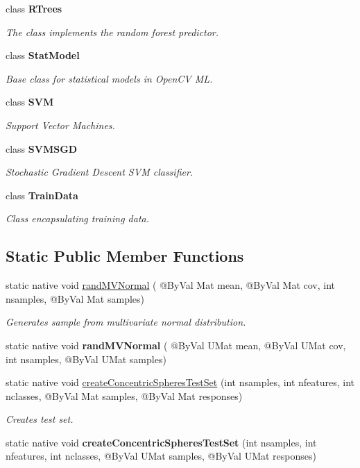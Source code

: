\begin{DoxyCompactItemize}
class {\bfseries R\+Trees}
\begin{DoxyCompactList}\small\item\em The class implements the random forest predictor. \end{DoxyCompactList}\item 
class {\bfseries Stat\+Model}
\begin{DoxyCompactList}\small\item\em Base class for statistical models in Open\+CV ML. \end{DoxyCompactList}\item 
class {\bfseries S\+VM}
\begin{DoxyCompactList}\small\item\em Support Vector Machines. \end{DoxyCompactList}\item 
class {\bfseries S\+V\+M\+S\+GD}
\begin{DoxyCompactList}\small\item\em Stochastic Gradient Descent S\+VM classifier. \end{DoxyCompactList}\item 
class {\bfseries Train\+Data}
\begin{DoxyCompactList}\small\item\em Class encapsulating training data. \end{DoxyCompactList}\end{DoxyCompactItemize}
\subsection*{Static Public Member Functions}
\begin{DoxyCompactItemize}
\item 
static native void \hyperlink{group__ml_gaeb2cdd5950f92be2f699b6ad5cf4a9ba}{rand\+M\+V\+Normal} ( @By\+Val Mat mean, @By\+Val Mat cov, int nsamples, @By\+Val Mat samples)
\begin{DoxyCompactList}\small\item\em Generates {\itshape sample} from multivariate normal distribution. \end{DoxyCompactList}\item 
static native void {\bfseries rand\+M\+V\+Normal} ( @By\+Val U\+Mat mean, @By\+Val U\+Mat cov, int nsamples, @By\+Val U\+Mat samples)
\item 
static native void \hyperlink{group__ml_ga800b1310714c638042e7cc627abab847}{create\+Concentric\+Spheres\+Test\+Set} (int nsamples, int nfeatures, int nclasses, @By\+Val Mat samples, @By\+Val Mat responses)
\begin{DoxyCompactList}\small\item\em Creates test set. \end{DoxyCompactList}\item 
static native void {\bfseries create\+Concentric\+Spheres\+Test\+Set} (int nsamples, int nfeatures, int nclasses, @By\+Val U\+Mat samples, @By\+Val U\+Mat responses)
\end{DoxyCompactItemize}
